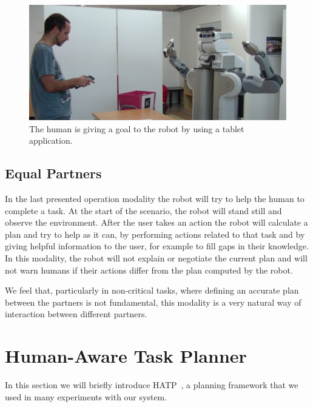 \begin{figure}[ht!]
 \centering
 \includegraphics[scale=0.25]{img/coworker/plan_management/tablet.pdf}
 \caption[Giving goals to the robot]{The human is giving a goal to the robot by using a tablet application.}
 \label{fig:plan_management-tablet}
 \end{figure}

\subsection{Equal Partners}
In the last presented operation modality the robot will try to help
the human to complete a task. At the start of the scenario, the robot
will stand still and observe the environment. After the user takes an
action the robot will calculate a plan and try to help as it can, by
performing actions related to that task and by giving helpful information to
the user, for example to fill gaps in their knowledge. In this modality, 
the robot will not explain or negotiate the current plan and will not warn humans if
their actions differ from the plan computed by the robot.

We feel that, particularly in non-critical tasks, where defining an accurate plan between the partners is not
fundamental, this modality is a very natural way of
interaction between different partners.



\section{Human-Aware Task Planner}
\label{sec:plan_management-hatp}
In this section we will briefly introduce HATP~\citep{Lallement2014}, a planning framework that we used in many experiments with our system.

